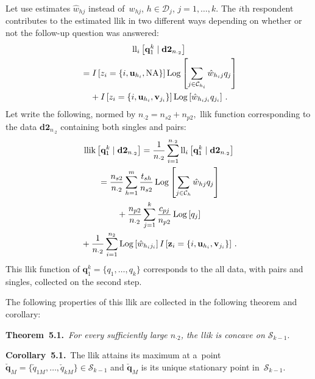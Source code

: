 \begin{multicols}{2}
\noindent
Let use estimates $\hat{w}_{hj}$ instead of~$w_{hj}$, $h\in\mathcal{D}_j$, 
  $j=1, \ldots, k.$
 The $i$th respondent contributes to  the estimated llik in two different ways
 depending on whether or not the follow-up question was answered:
\begin{multline*}
\mathrm{ll}_i \left[\mathbf{q}_1^k \mid  {\bf d2}_{n_{\cdot 2}}\right]\\
{} =  I\left[z_i =\left\{  i, \mathbf{u}_{h_i}, \mathrm{NA}\right\}\right] \mathrm{Log} 
\left [ \sum\limits_{j\in\mathcal{C}_{h_i}} \hat{ w}_{h_ij}q_j \right ] \\
{} +  I\left[z_i =\{ i, {\bf u}_{h_i}, {\bf v}_{j_i}\}\right]
      \mathrm{Log} \left[ \hat{w}_{h_i j_i}q_{j_i} \right]\,.
\end{multline*}
Let write the following, normed by $n_{\cdot 2}=n_{s 2}+n_{p 2},$
llik function corresponding to the data $\mathbf{d2}_{n_{\cdot 2}}$  containing both singles and pairs:
\begin{multline}
\label{FR-522}
\mathrm{llik}\left[ \mathbf{q}_1^k \mid  \mathbf{d2}_{n_{\cdot 2}}\right]
    = \displaystyle\frac{\displaystyle 1\mathstrut}{\displaystyle n_{\cdot 2}\mathstrut} \sum\limits_{i=1}^{n_{\cdot 2}} \mathrm{ll}_i
    \left[\mathbf{q}_1^k \mid \mathbf{d2}_{n_{\cdot 2}}\right]
    \\
 {}=   \displaystyle\frac{\displaystyle n_{s2}\mathstrut}{\displaystyle n_{\cdot 2}\mathstrut}\sum\limits_{h=1}^m \displaystyle\frac{\displaystyle t_{sh}\mathstrut}{\displaystyle n_{s2}\mathstrut} \,\mathrm{
    Log}  \left [ \sum\limits_{j\in\mathcal{C}_h} \hat{w}_{hj} q_j \right ]\\
{} +
  \displaystyle\frac{\displaystyle n_{p2}\mathstrut}{\displaystyle n_{\cdot 2}\mathstrut} \sum\limits_{j=1}^k \displaystyle\frac{\displaystyle c_{pj}\mathstrut}{\displaystyle n_{p2}\mathstrut}\,\mathrm{Log}
  \left[q_j\right]  \\
{}+ \displaystyle\frac{\displaystyle 1\mathstrut}{\displaystyle n_{\cdot 2}\mathstrut}
    \sum\limits_{i=1}^{n_2} \mathrm{Log} 
    \left[ \hat{w}_{h_i j_i}\right] I\left[ \mathbf{z}_i =\left\{ i, \mathbf{u}_{h_i},
    \mathbf{v}_{j_i}\right\} \right]\,.
\end{multline}
This llik
 function of $\mathbf{q}_1^k=\{q_1, \ldots, q_k\}$  corresponds to the all data, 
 with pairs and singles, collected on the second step.

The following properties of this llik are collected in 
the following theorem and corollary:

\pagebreak

\noindent
\textbf{Theorem~5.1.}\
\textit{For every sufficiently large $n_{\cdot 2}$,
 the llik  is concave on $\mathcal{S}_{k-1}.$}
 
 \smallskip
 
 \noindent
 \textbf{Corollary~5.1.}\
 The llik  attains its maximum at  a~point $\check{\mathbf{q}}_{M} =
 \{ \check q_{1M}, \ldots, \check q_{kM}\}\in \mathcal{S}_{k-1}$ and 
 $\check{\mathbf{q}}_{M}$  is its unique stationary point in~$\mathcal{S}_{k-1}.$


\end{multicols}
